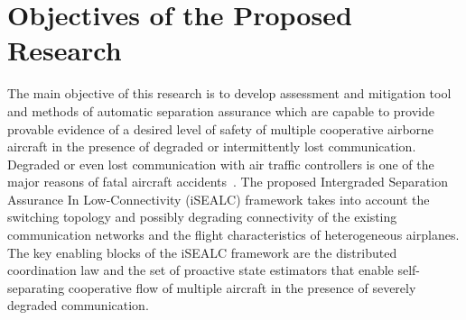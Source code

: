 \documentclass[letter,onecolumn,12pt]{aiaa-tc}
\newcommand{\1}{1_n}
\begin{document}



\clearpage
\thispagestyle{empty}
\tableofcontents



\clearpage
\pagestyle{plain}

\section{Objectives of the Proposed Research}

The main objective of this research is to develop assessment and mitigation tool and methods of automatic separation assurance which are capable to provide provable evidence of a desired level of safety of multiple cooperative airborne aircraft in the presence of degraded or intermittently lost communication. Degraded or even lost communication with air traffic controllers is one of the major reasons of fatal aircraft accidents~\cite{Kochenderfer_2012}. The proposed  Intergraded Separation Assurance In Low-Connectivity (iSEALC) framework takes into account the switching topology and possibly degrading connectivity of the existing communication networks and the flight characteristics of heterogeneous airplanes. The key enabling blocks of the iSEALC framework are the distributed coordination law and the set of proactive state estimators that enable self-separating cooperative flow of multiple aircraft in the presence of severely degraded communication.
\end{document}
